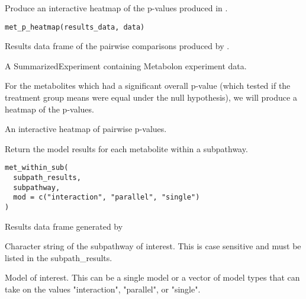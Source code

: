 \documentclass[a4paper]{book}
\begin{document}
%
\begin{Description}
Produce an interactive heatmap of the p-values produced in .
\end{Description}
%
\begin{Usage}
\begin{verbatim}
met_p_heatmap(results_data, data)
\end{verbatim}
\end{Usage}
%
\begin{Arguments}
\begin{ldescription}
\item[\code{results\_data}] Results data frame of the pairwise comparisons produced by .

\item[\code{data}] A SummarizedExperiment containing Metabolon experiment data.
\end{ldescription}
\end{Arguments}
%
\begin{Details}
For the metabolites which had a significant overall p-value (which tested if the
treatment group means were equal under the null hypothesis), we will produce a
heatmap of the p-values.
\end{Details}
%
\begin{Value}
An interactive heatmap of pairwise p-values.
\end{Value}
%
\begin{Description}
Return the model results for each metabolite within a subpathway.
\end{Description}
%
\begin{Usage}
\begin{verbatim}
met_within_sub(
  subpath_results,
  subpathway,
  mod = c("interaction", "parallel", "single")
)
\end{verbatim}
\end{Usage}
%
\begin{Arguments}
\begin{ldescription}
\item[\code{subpath\_results}] Results data frame generated by 

\item[\code{subpathway}] Character string of the subpathway of interest. This is case sensitive
and must be listed in the subpath\_results.

\item[\code{mod}] Model of interest. This can be a single model or a vector of model types
that can take on the values "interaction", "parallel", or "single".
\end{ldescription}
\end{Arguments}
\end{document}
